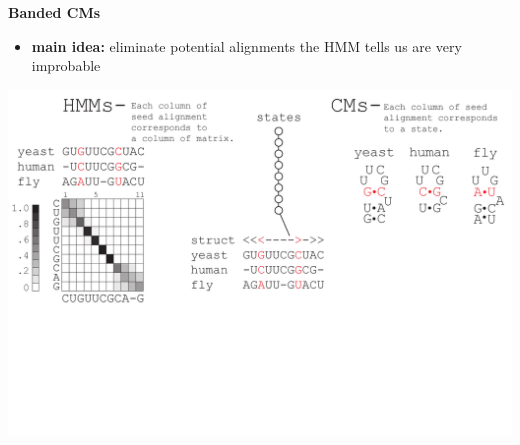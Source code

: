 \documentclass[landscape]{slides}
\begin{document}
\begin{slide}
\begin{center}
\large
\textbf{Banded CMs}
\end{center}
\medskip
\small
\begin{itemize}
\item
\textbf{main idea:} eliminate potential alignments the HMM tells us are very improbable
\end{itemize}
\begin{center}
\includegraphics[width=8in]{figs/post_hmm_to_cm_map2_layer3}
\end{center}
\vfill
\end{slide}
\end{document}
